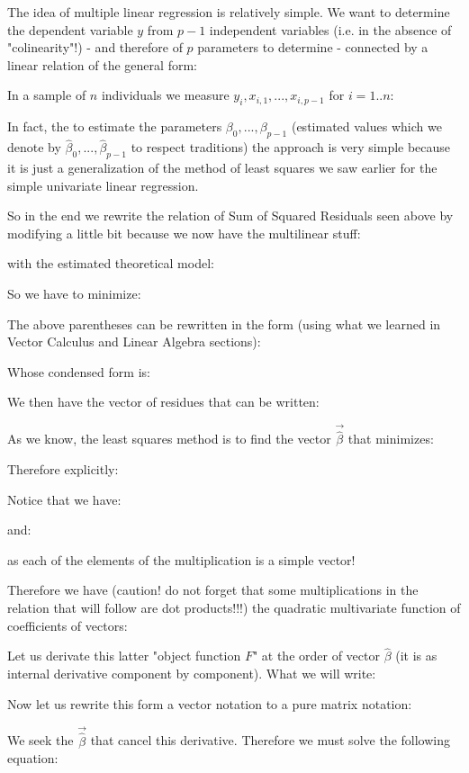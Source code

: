 	The idea of multiple linear regression is relatively simple. We want to determine the dependent variable $y$ from $p-1$ independent variables (i.e. in the absence of "colinearity"!) - and therefore of $p$ parameters to determine - connected by a linear relation of the general form:
	
	In a sample of $n$ individuals we measure $y_i,x_{i,1},...,x_{i,p-1}$ for $i=1..n$:
	
	In fact, the to estimate the parameters $\beta_0,...,\beta_{p-1}$ (estimated values which we denote by $\hat{\beta}_0,...,\hat{\beta}_{p-1}$ to respect traditions) the approach is very simple because it is just a generalization of the method of least squares we saw earlier for the simple univariate linear regression.
	
	So in the end we rewrite the relation of Sum of Squared Residuals seen above by modifying a little bit because we now have the multilinear stuff:
	
	with the estimated theoretical model:
	
	So we have to minimize:
	
	The above parentheses can be rewritten in the form (using what we learned in Vector Calculus and Linear Algebra sections):
	
	Whose condensed form is:
	
	We then have the vector of residues that can be written:
	
	As we know, the least squares method is to find the vector $\vec{\hat{\beta}}$ that minimizes:
		
	Therefore explicitly:
	
	Notice that we have:
	
	and:
	
	as each of the elements of the multiplication is a simple vector!
	
	Therefore we have (caution! do not forget that some multiplications in the relation that will follow are dot products!!!) the quadratic multivariate function of coefficients of vectors:
	
	Let us derivate this latter "object function $F$" at the order of vector $\hat{\beta}$ (it is as internal derivative component by component). What we will write:
	
	Now let us rewrite this form a vector notation to a pure matrix notation:
	
	We seek the $\vec{\hat{\beta}}$ that cancel this derivative. Therefore we must solve the following equation:
	
